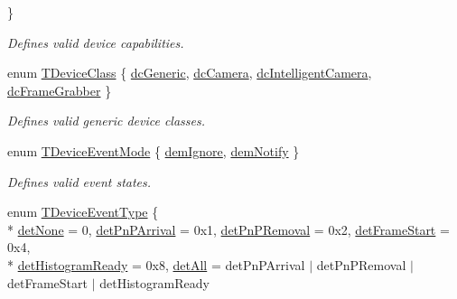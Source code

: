 \begin{DoxyCompactItemize}
 \}
\begin{DoxyCompactList}\small\item\em Defines valid device capabilities. \end{DoxyCompactList}\item 
enum \hyperlink{group___common_interface_ga9f8cbab52f6b995214e7ac4bc56bc11a}{T\+Device\+Class} \{ \hyperlink{group___common_interface_gga9f8cbab52f6b995214e7ac4bc56bc11aaab78fc05c6dacb858817a60ed7d7ca60}{dc\+Generic}, 
\hyperlink{group___common_interface_gga9f8cbab52f6b995214e7ac4bc56bc11aa9c75b19855af6f99b70ce110afba41db}{dc\+Camera}, 
\hyperlink{group___common_interface_gga9f8cbab52f6b995214e7ac4bc56bc11aa02310dd162d69934889101f6166921e9}{dc\+Intelligent\+Camera}, 
\hyperlink{group___common_interface_gga9f8cbab52f6b995214e7ac4bc56bc11aac3cefa8d69850f9c85bd54018ce4498d}{dc\+Frame\+Grabber}
 \}
\begin{DoxyCompactList}\small\item\em Defines valid generic device classes. \end{DoxyCompactList}\item 
enum \hyperlink{group___common_interface_gaaf184a07cd31343a6b831f41ee7038b4}{T\+Device\+Event\+Mode} \{ \hyperlink{group___common_interface_ggaaf184a07cd31343a6b831f41ee7038b4a428db97d58edd4f45f5b7e7bf1a87a9f}{dem\+Ignore}, 
\hyperlink{group___common_interface_ggaaf184a07cd31343a6b831f41ee7038b4a96b9ffffa11d23585f046e907b928795}{dem\+Notify}
 \}
\begin{DoxyCompactList}\small\item\em Defines valid event states. \end{DoxyCompactList}\item 
enum \hyperlink{group___common_interface_ga0947eb7d6a73b9baab283cbf65cd8d6b}{T\+Device\+Event\+Type} \{ \\*
\hyperlink{group___common_interface_gga0947eb7d6a73b9baab283cbf65cd8d6ba944e8883a4bd454ef2ff2bcee9451cfb}{det\+None} = 0, 
\hyperlink{group___common_interface_gga0947eb7d6a73b9baab283cbf65cd8d6bae72bb800d1cb1bdc884bb666324a410a}{det\+Pn\+P\+Arrival} = 0x1, 
\hyperlink{group___common_interface_gga0947eb7d6a73b9baab283cbf65cd8d6bac951ab7abab67fbaa3249ad87084efaf}{det\+Pn\+P\+Removal} = 0x2, 
\hyperlink{group___common_interface_gga0947eb7d6a73b9baab283cbf65cd8d6ba47f3a4c4f121f12d9eeef13a080199ae}{det\+Frame\+Start} = 0x4, 
\\*
\hyperlink{group___common_interface_gga0947eb7d6a73b9baab283cbf65cd8d6bacd0d2755cf23862c616cff1d3da5e57b}{det\+Histogram\+Ready} = 0x8, 
\hyperlink{group___common_interface_gga0947eb7d6a73b9baab283cbf65cd8d6badbc38721cba54c6ead7d62dc6321b2da}{det\+All} = det\+Pn\+P\+Arrival $\vert$ det\+Pn\+P\+Removal $\vert$ det\+Frame\+Start $\vert$ det\+Histogram\+Ready

\end{DoxyCompactItemize}
